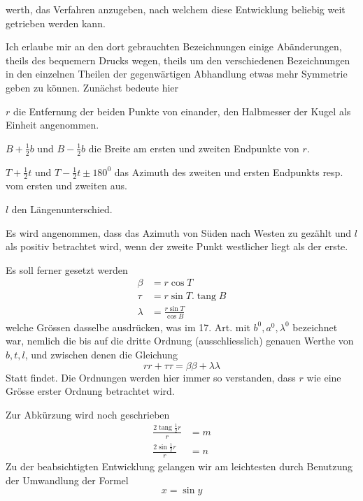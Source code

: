 %
werth, das Verfahren anzugeben, nach welchem diese Entwicklung beliebig weit getrieben werden kann.

Ich erlaube mir an den dort gebrauchten Bezeichnungen einige Abänderungen, theils des bequemern Drucks wegen, theils um den verschiedenen Bezeichnungen in den einzelnen Theilen der gegenwärtigen Abhandlung etwas mehr Symmetrie geben zu können. Zunächst bedeute hier
\begin{list}{}{\setlength{\leftmargin}{1.4em}\setlength{\itemindent}{-1.4em}\setlength{\itemsep}{0pt}\setlength{\parsep}{0pt}}
\item \(r\) die Entfernung der beiden Punkte von einander, den Halbmesser der Kugel als Einheit angenommen.
\item \(B+\frac12b\) und \(B-\frac12b\) die Breite am ersten und zweiten Endpunkte von \(r\).
\item \(T+\frac12t\) und \(T-\frac12t\pm180^0\) das Azimuth des zweiten und ersten Endpunkts resp. vom ersten und zweiten aus.
\item \(l\) den Längenunterschied.
\end{list}
\noindent Es wird angenommen, dass das Azimuth von Süden nach Westen zu gezählt und \(l\) als positiv betrachtet wird, wenn der zweite Punkt westlicher liegt als der erste.

Es soll ferner gesetzt werden
\[
\begin{aligned}
\beta&=r\cos T\\
\tau&=r\sin T\mathord{.}\operatorname{tang}B\\
\lambda&=\frac{r\sin T}{\cos B}
\end{aligned}
\]
welche Grössen dasselbe ausdrücken, was im 17. Art. mit \(b^0,a^0,\lambda^0\) bezeichnet war, nemlich die bis auf die dritte Ordnung (ausschliesslich) genauen Werthe von \(b,t,l\), und zwischen denen die Gleichung
\[
rr+\tau\tau=\beta\beta+\lambda\lambda
\]
Statt findet. Die Ordnungen werden hier immer so verstanden, dass \(r\) wie eine Grösse erster Ordnung betrachtet wird.

\indent Zur Abkürzung wird noch geschrieben
\[
\begin{aligned}
\frac{2\operatorname{tang}\frac12r}{r}&=m\\
\frac{2\sin\frac12r}{r}&=n
\end{aligned}
\]
Zu der beabsichtigten Entwicklung gelangen wir am leichtesten durch Benutzung der Umwandlung der Formel
\[
x=\sin y
\]
